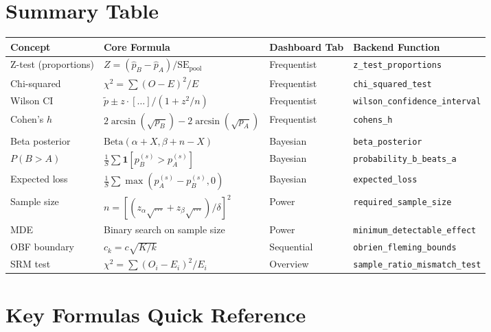 \documentclass[11pt,a4paper]{article}
\newcommand{\code}[1]{\texttt{#1}}
\begin{document}
\section{Summary Table}

\begin{tabular}{@{}p{3.5cm}p{5cm}p{2cm}p{3.5cm}@{}}
\toprule
\textbf{Concept} & \textbf{Core Formula} & \textbf{Dashboard Tab} & \textbf{Backend Function} \\
\midrule
Z-test (proportions) & $Z = (\hat{p}_B - \hat{p}_A) / \mathrm{SE}_{\mathrm{pool}}$ & Frequentist & \code{z\_test\_proportions} \\
Chi-squared & $\chi^2 = \sum (O-E)^2/E$ & Frequentist & \code{chi\_squared\_test} \\
Wilson CI & $\tilde{p} \pm z \cdot [\ldots] / (1+z^2/n)$ & Frequentist & \code{wilson\_confidence\_interval} \\
Cohen's $h$ & $2\arcsin(\sqrt{p_B}) - 2\arcsin(\sqrt{p_A})$ & Frequentist & \code{cohens\_h} \\
Beta posterior & $\mathrm{Beta}(\alpha+X, \beta+n-X)$ & Bayesian & \code{beta\_posterior} \\
$P(B>A)$ & $\frac{1}{S}\sum \mathbf{1}[p_B^{(s)} > p_A^{(s)}]$ & Bayesian & \code{probability\_b\_beats\_a} \\
Expected loss & $\frac{1}{S}\sum \max(p_A^{(s)}-p_B^{(s)}, 0)$ & Bayesian & \code{expected\_loss} \\
Sample size & $n = [(z_\alpha\sqrt{\ldots}+z_\beta\sqrt{\ldots})/\delta]^2$ & Power & \code{required\_sample\_size} \\
MDE & Binary search on sample size & Power & \code{minimum\_detectable\_effect} \\
OBF boundary & $c_k = c\sqrt{K/k}$ & Sequential & \code{obrien\_fleming\_bounds} \\
SRM test & $\chi^2 = \sum(O_i-E_i)^2/E_i$ & Overview & \code{sample\_ratio\_mismatch\_test} \\
\bottomrule
\end{tabular}


\section{Key Formulas Quick Reference}
\end{document}
